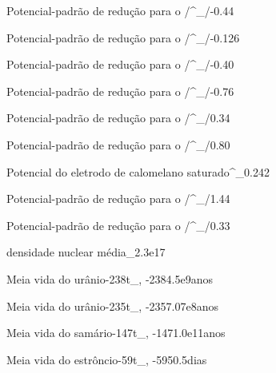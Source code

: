 {Potencial-padrão de redução para o /}{^{\standardstate}_{/}}{-0.44}{\volt}

{Potencial-padrão de redução para o /}{^{\standardstate}_{/}}{-0.126}{\volt}

{Potencial-padrão de redução para o /}{^{\standardstate}_{/}}{-0.40}{\volt}

{Potencial-padrão de redução para o /}{^{\standardstate}_{/}}{-0.76}{\volt}

{Potencial-padrão de redução para o /}{^{\standardstate}_{/}}{0.34}{\volt}

{Potencial-padrão de redução para o /}{^{\standardstate}_{/}}{0.80}{\volt}

{Potencial do eletrodo de calomelano saturado}{^{\standardstate}_}{0.242}{\volt}




{Potencial-padrão de redução para o /}{^{\standardstate}_{/}}{1.44}{\volt}

{Potencial-padrão de redução para o /}{^{\standardstate}_{/}}{0.33}{\volt}

%                                              
%                                              

{densidade nuclear média}{\rho_{}}{2.3e17}{\kilo\gram\per\cubic\meter}

{Meia vida do urânio-238}{t_{, -238}}{4.5e9}{anos}

{Meia vida do urânio-235}{t_{, -235}}{7.07e8}{anos}


{Meia vida do samário-147}{t_{, -147}}{1.0e11}{anos}

{Meia vida do estrôncio-59}{t_{, -59}}{50.5}{dias}

